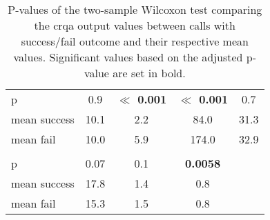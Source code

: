 \begin{table}[t]
	\caption{P-values of the two-sample Wilcoxon test comparing the \ac{crqa} output values between calls with success/fail outcome and their respective mean values.
		Significant values based on the adjusted p-value are set in bold.}
	\label{tab:crqa_results}
	\begin{tabularx}{\linewidth}{XSSSS}
		\toprule
		& {} & {} & {}	& {} \\
		\midrule
		p 				& 0.9		& \bfseries $\ll$ 0.001	& \bfseries $\ll$ 0.001	& 0.7  \\
		mean success	& 10.1		& 2.2					& 84.0					& 31.3 \\
		mean fail		& 10.0		& 5.9					& 174.0					& 32.9 \\
		
		\midrule
		& {} 	& {} 	& {} 	& 						\\
		\midrule
		p 				& 0.07				& 0.1				& \bfseries 0.0058	& 	\\
		mean success	& 17.8				& 1.4				& 0.8				& 	\\
		mean fail		& 15.3				& 1.5				& 0.8				& 	\\
		
		\bottomrule	
	\end{tabularx}
\end{table}

